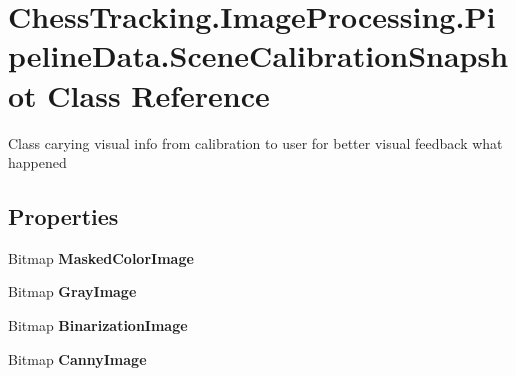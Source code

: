\hypertarget{class_chess_tracking_1_1_image_processing_1_1_pipeline_data_1_1_scene_calibration_snapshot}{}\section{Chess\+Tracking.\+Image\+Processing.\+Pipeline\+Data.\+Scene\+Calibration\+Snapshot Class Reference}
\label{class_chess_tracking_1_1_image_processing_1_1_pipeline_data_1_1_scene_calibration_snapshot}


Class carying visual info from calibration to user for better visual feedback what happened  


\subsection*{Properties}
\begin{DoxyCompactItemize}
\item 
\mbox{\label{class_chess_tracking_1_1_image_processing_1_1_pipeline_data_1_1_scene_calibration_snapshot_a8f128b9f6f15e27a598d4c888a2c27f0}} 
Bitmap {\bfseries Masked\+Color\+Image}
\item 
\mbox{\label{class_chess_tracking_1_1_image_processing_1_1_pipeline_data_1_1_scene_calibration_snapshot_a704e208f9af8320d2c537516be3455ef}} 
Bitmap {\bfseries Gray\+Image}
\item 
\mbox{\label{class_chess_tracking_1_1_image_processing_1_1_pipeline_data_1_1_scene_calibration_snapshot_af1fce15f6626411375543f5aa895abc8}} 
Bitmap {\bfseries Binarization\+Image}
\item 
\mbox{\label{class_chess_tracking_1_1_image_processing_1_1_pipeline_data_1_1_scene_calibration_snapshot_a1dc445b77a274df407e3b17b5f4fee6e}} 
Bitmap {\bfseries Canny\+Image}
\end{DoxyCompactItemize}



